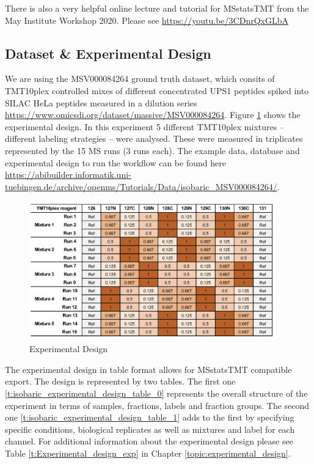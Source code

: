 \noindent There is also a very helpful online lecture and tutorial for MSstatsTMT from the May Institute Workshop 2020. Please see \url{https://youtu.be/3CDnrQxGLbA}

\subsection{Dataset \& Experimental Design}
We are using the MSV000084264 ground truth dataset, which consits of TMT10plex controlled mixes of different concentrated UPS1 peptides spiked into SILAC HeLa peptides measured in a dilution series \url{https://www.omicsdi.org/dataset/massive/MSV000084264}. Figure \ref{fig:isobaric_experimental_design} shows the experimental design. In this experiment 5 different TMT10plex mixtures -- different labeling strategies -- were analysed. These were measured in triplicates represented by the 15 MS runs (3 runs each). The example data, database and experimental design to run the workflow can be found here \url{https://abibuilder.informatik.uni-tuebingen.de/archive/openms/Tutorials/Data/isobaric_MSV000084264/}.

\begin{figure}[htbp]
  \centering
 \includegraphics[width=0.95\textwidth]{graphics/isobaric/isobaric_experimental_design.jpg}
  \caption{Experimental Design}
  \label{fig:isobaric_experimental_design}
\end{figure}
  
\noindent The experimental design in table format allows for MSstatsTMT compatible export. The design is represented by two tables. The first one \ref{t:isobaric_experimental_design_table_0} represents the overall structure of the experiment in terms of samples, fractions, labels and fraction groups. The second one \ref{t:isobaric_experimental_design_table_1} adds to the first by specifying specific conditions, biological replicates as well as mixtures and label for each channel. For additional information about the experimental design please see Table  \ref{t:Experimental_design_exp} in Chapter \ref{topic:experimental_design}. 

